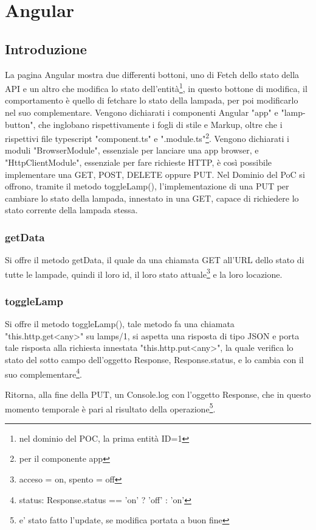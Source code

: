 \chapter{Angular}\label{angular}

\section{Introduzione}

La pagina Angular mostra due differenti bottoni, uno di Fetch dello stato della API e un altro che modifica lo stato dell'entità\footnote{nel dominio del POC, la prima entità ID=1}, in questo bottone di modifica, il comportamento è quello di fetchare lo stato della lampada, per poi modificarlo nel suo complementare.
Vengono dichiarati i componenti Angular "app" e "lamp-button", che inglobano rispettivamente i fogli di stile e Markup, oltre che i rispettivi file typescript "component.ts" e ".module.ts"\footnote{per il componente app}. 
Vengono dichiarati i moduli "BrowserModule", essenziale per lanciare una app browser, e "HttpClientModule", essenziale per fare richieste HTTP, è così possibile implementare una GET, POST, DELETE oppure PUT.
Nel Dominio del PoC si offrono, tramite il metodo toggleLamp(), l'implementazione di una PUT per cambiare lo stato della lampada, innestato in una GET, capace di richiedere lo stato corrente della lampada stessa.

\subsection{getData}

Si offre il metodo getData, il quale da una chiamata GET all'URL dello stato di tutte le lampade, quindi il loro id, il loro stato attuale\footnote{acceso = on, spento = off} e la loro locazione.

\subsection{toggleLamp}

Si offre il metodo toggleLamp(), tale metodo fa una chiamata "this.http.get<any>" su lamps/1, si aspetta una risposta di tipo JSON e porta tale risposta alla richiesta innestata "this.http.put<any>", la quale verifica lo stato del sotto campo dell'oggetto Response, Response.status, e lo cambia con il suo complementare\footnote{status: Response.status == 'on' ? 'off' : 'on'}.

Ritorna, alla fine della PUT, un Console.log con l'oggetto Response, che in questo momento temporale è pari al risultato della operazione\footnote{e' stato fatto l'update, se modifica portata a buon fine}.


